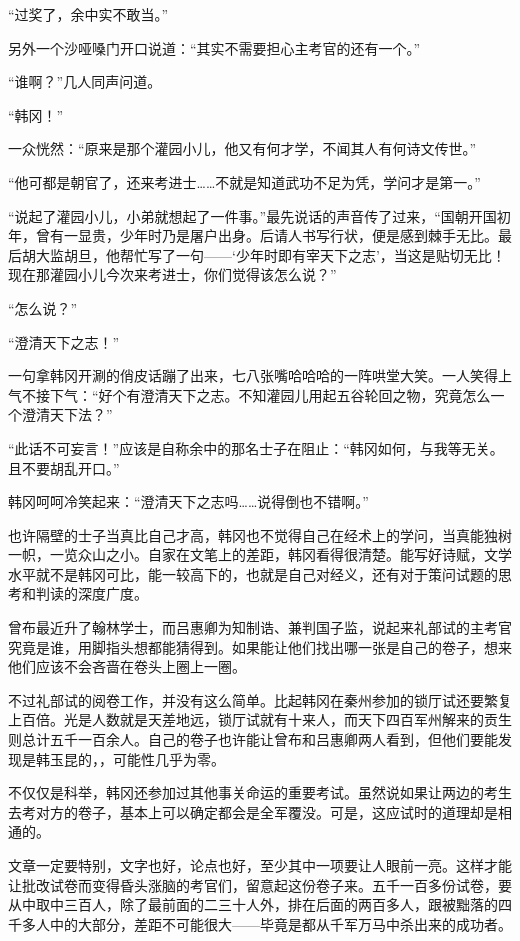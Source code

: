 “过奖了，余中实不敢当。”

另外一个沙哑嗓门开口说道：“其实不需要担心主考官的还有一个。”

“谁啊？”几人同声问道。

“韩冈！”

一众恍然：“原来是那个灌园小儿，他又有何才学，不闻其人有何诗文传世。”

“他可都是朝官了，还来考进士……不就是知道武功不足为凭，学问才是第一。”

“说起了灌园小儿，小弟就想起了一件事。”最先说话的声音传了过来，“国朝开国初年，曾有一显贵，少年时乃是屠户出身。后请人书写行状，便是感到棘手无比。最后胡大监胡旦，他帮忙写了一句——‘少年时即有宰天下之志’，当这是贴切无比！现在那灌园小儿今次来考进士，你们觉得该怎么说？”

“怎么说？”

“澄清天下之志！”

一句拿韩冈开涮的俏皮话蹦了出来，七八张嘴哈哈哈的一阵哄堂大笑。一人笑得上气不接下气：“好个有澄清天下之志。不知灌园儿用起五谷轮回之物，究竟怎么一个澄清天下法？”

“此话不可妄言！”应该是自称余中的那名士子在阻止：“韩冈如何，与我等无关。且不要胡乱开口。”

韩冈呵呵冷笑起来：“澄清天下之志吗……说得倒也不错啊。”

也许隔壁的士子当真比自己才高，韩冈也不觉得自己在经术上的学问，当真能独树一帜，一览众山之小。自家在文笔上的差距，韩冈看得很清楚。能写好诗赋，文学水平就不是韩冈可比，能一较高下的，也就是自己对经义，还有对于策问试题的思考和判读的深度广度。

曾布最近升了翰林学士，而吕惠卿为知制诰、兼判国子监，说起来礼部试的主考官究竟是谁，用脚指头想都能猜得到。如果能让他们找出哪一张是自己的卷子，想来他们应该不会吝啬在卷头上圈上一圈。

不过礼部试的阅卷工作，并没有这么简单。比起韩冈在秦州参加的锁厅试还要繁复上百倍。光是人数就是天差地远，锁厅试就有十来人，而天下四百军州解来的贡生则总计五千一百余人。自己的卷子也许能让曾布和吕惠卿两人看到，但他们要能发现是韩玉昆的，，可能性几乎为零。

不仅仅是科举，韩冈还参加过其他事关命运的重要考试。虽然说如果让两边的考生去考对方的卷子，基本上可以确定都会是全军覆没。可是，这应试时的道理却是相通的。

文章一定要特别，文字也好，论点也好，至少其中一项要让人眼前一亮。这样才能让批改试卷而变得昏头涨脑的考官们，留意起这份卷子来。五千一百多份试卷，要从中取中三百人，除了最前面的二三十人外，排在后面的两百多人，跟被黜落的四千多人中的大部分，差距不可能很大——毕竟是都从千军万马中杀出来的成功者。


